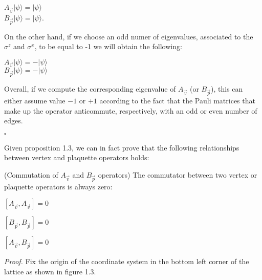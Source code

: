 \documentclass{Configuration_Files/PoliMi3i_thesis}
\begin{document}
\begin{center}
	$A_{\vec{v}} |\psi\rangle = |\psi\rangle$ \\
	$B_{\vec{p}} |\psi\rangle = |\psi\rangle$.
\end{center}

On the other hand, if we choose an odd numer of eigenvalues, associated to the $\sigma^z$ and $\sigma^x$, to be equal to -1 we will obtain the following:

\begin{center}
	$A_{\vec{v}} |\psi\rangle = -|\psi\rangle$ \\
	$B_{\vec{p}} |\psi\rangle = -|\psi\rangle$
\end{center}

Overall, if we compute the corresponding eigenvalue of $A_{\vec{v}}$ (or $B_{\vec{p}}$), this can either assume value $-1$ or $+1$ according to the fact that the Pauli matrices that make up the operator anticommute, respectively, with an odd or even number of edges.

\hfill $\square$

Given proposition 1.3, we can in fact prove that the following relationships between vertex and plaquette operators holds:

\begin{proposition} (Commutation of $A_{\vec{v}}$ and $B_{\vec{p}}$ operators) The commutator between two vertex or plaquette operators is always zero:

\begin{center}
	$[A_{\vec{v}},A_{\vec{v}}]=0$ 
\end{center}

\begin{center}
	$[B_{\vec{p}},B_{\vec{p}}]=0$ 
\end{center}

\begin{center}
	$[A_{\vec{v}},B_{\vec{p}}]=0$ 
\end{center}
	
\end{proposition}




\textit{Proof.}\newline 
Fix the origin of the coordinate system in the bottom left corner of the lattice as shown in figure 1.3. 
\end{document}
